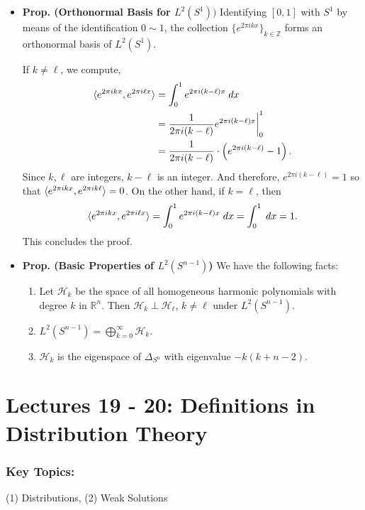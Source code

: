 \documentclass{article}
\begin{document}
\begin{itemize}
	
	\item \textbf{Prop. (Orthonormal Basis for $L^{2}(S^{1}))$} Identifying $[0,1]$ with $S^{1}$ by means of the identification $0 \sim 1$, the collection $\{e^{2\pi i k x}\}_{k \in \mathbb{Z}}$ forms an orthonormal basis of $L^{2}(S^{1})$. 
	
	{\color{orange}
		If $k \neq \ell$, we compute, 
			\begin{align}
				\begin{split}
					\braket{e^{2\pi i k x}, e^{2\pi i \ell x}} &= \int_{0}^{1}e^{2\pi i (k - \ell)x}\;dx \\
					&= \frac{1}{2\pi i (k - \ell)}e^{2\pi i (k - \ell)x} \bigg|_{0}^{1} \\
					&= \frac{1}{2\pi i (k- \ell)}\cdot \left(e^{2\pi i (k - \ell)} - 1\right). 
				\end{split}
			\end{align}	
		Since $k, \ell$ are integers, $k - \ell$ is an integer. And therefore, $e^{2\pi i (k - \ell)} = 1$ so that $\braket{e^{2\pi i k x}, e^{2\pi i k\ell}} = 0$. On the other hand, if $k = \ell$, then 
			\begin{equation}
				\braket{e^{2\pi i k x}, e^{2\pi i \ell x}} = \int_{0}^{1}e^{2\pi i (k - \ell)x}\;dx = \int_{0}^{1}\;dx = 1. 
			\end{equation}
		This concludes the proof. 
	}
	
	\item \textbf{Prop. (Basic Properties of $L^{2}(S^{n-1})$)} We have the following facts: \vspace{-0.25cm}
		\begin{enumerate}[itemsep =-2pt,label = (\arabic{*})]
			\item Let $\mathcal{H}_{k}$ be the space of all homogeneous harmonic polynomials with degree $k$ in $\mathbb{R}^{n}$. Then $\mathcal{H}_{k} \perp \mathcal{H}_{\ell}$, $k \neq \ell$ under $L^{2}(S^{n-1})$. 
			\item $L^{2}(S^{n-1}) = \bigoplus_{k =0}^{\infty}\mathcal{H}_{k}$. 
			\item $\mathcal{H}_{k}$ is the eigenspace of $\Delta_{S^{n}}$ with eigenvalue $-k(k  +n -2)$.
		\end{enumerate}
\end{itemize}

\newpage 
\section{Lectures 19 - 20: Definitions in Distribution Theory}
\subsubsection{Key Topics:} (1) Distributions, (2) Weak Solutions 
\end{document}
